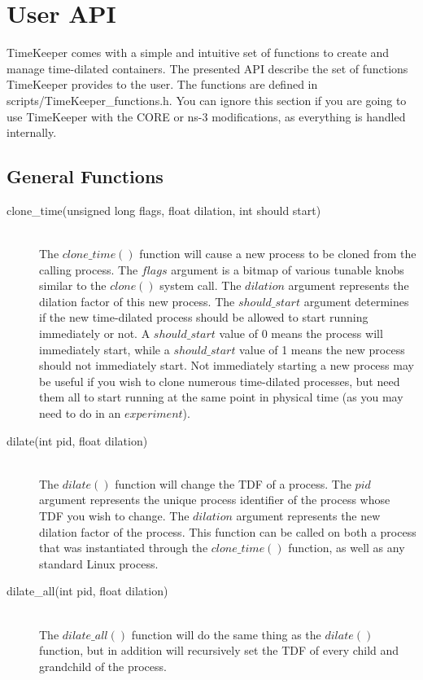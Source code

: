 \chapter{User API}
\label{chap:design}
TimeKeeper comes with a simple and intuitive set of functions to create and manage time-dilated containers. The presented API describe the set of functions TimeKeeper provides to the user. The functions are defined in scripts/TimeKeeper\_functions.h. You can ignore this section if you are going to use TimeKeeper with the CORE or ns-3 modifications, as everything is handled internally.

\section{General Functions}
\begin{description}
 \item[clone\_time(unsigned long flags, float dilation, int should start) ] \hfill \\
 The $clone\_time()$ function will cause a new process to be cloned from the calling process. The $flags$ argument is a bitmap of various tunable knobs similar to the $clone()$ system call. The $dilation$ argument represents the dilation factor of this new process. The $should\_start$ argument determines if the new time-dilated process should be allowed to start running immediately or not. A $should\_start$ value of 0 means the process will immediately start, while a $should\_start$ value of 1 means the new process should not immediately start. Not immediately starting a new process may be useful if you wish to clone numerous time-dilated processes, but need them all to start running at the same point in physical time (as you may need to do in an $experiment$).
 \item[dilate(int pid, float dilation) ] \hfill \\
 The $dilate()$ function will change the TDF of a process. The $pid$ argument represents the unique process identifier of the process whose TDF you wish to change. The $dilation$ argument represents the new dilation factor of the process. This function can be called on both a process that was instantiated through the $clone\_time()$ function, as well as any standard Linux process.
 \item[dilate\_all(int pid, float dilation) ] \hfill \\
The $dilate\_all()$ function will do the same thing as the $dilate()$ function, but in addition will recursively set the TDF of every child and grandchild of the process. 

\end{description}

